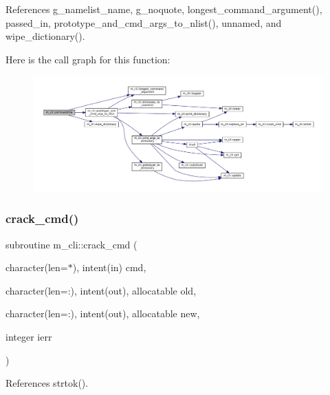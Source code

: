 References g\+\_\+namelist\+\_\+name, g\+\_\+noquote, longest\+\_\+command\+\_\+argument(), passed\+\_\+in, prototype\+\_\+and\+\_\+cmd\+\_\+args\+\_\+to\+\_\+nlist(), unnamed, and wipe\+\_\+dictionary().

Here is the call graph for this function\+:\nopagebreak
\begin{figure}[H]
\begin{center}
\leavevmode
\includegraphics[width=350pt]{namespacem__cli_a4f639b0c4bf16930fc1c5858ed4196a3_cgraph}
\end{center}
\end{figure}
\mbox{\label{namespacem__cli_a8d5d1954aac6494e07fb11f12f635c85}} 
\subsubsection{\texorpdfstring{crack\+\_\+cmd()}{crack\_cmd()}}
{\footnotesize\ttfamily subroutine m\+\_\+cli\+::crack\+\_\+cmd (\begin{DoxyParamCaption}\item[{character(len=$\ast$), intent(in)}]{cmd,  }\item[{character(len=\+:), intent(out), allocatable}]{old,  }\item[{character(len=\+:), intent(out), allocatable}]{new,  }\item[{integer}]{ierr }\end{DoxyParamCaption})\hspace{0.3cm}{\ttfamily [private]}}



References strtok().

